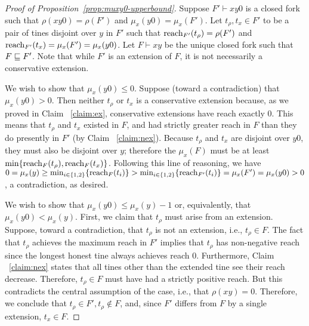\begin{proof}[Proof of Proposition~\ref{prop:muxy0-upperbound}]
  Suppose $F'\vdash xy0$ is a closed fork such that 
  $\rho(xy0)=\rho(F')$ and $\mu_x(y0)=\mu_x(F')$. 
  Let $t_\rho, t_x \in F'$ to be a pair of tines disjoint over $y$ in $F'$ such that $\operatorname{reach}_{F'}(t_\rho)=\rho(F')$ and $\operatorname{reach}_{F'}(t_x)=\mu_x(F')=\mu_x(y0)$. 
  Let $F\vdash xy$ be the unique closed fork such that $F\sqsubseteq F'$.  
  Note that while $F'$ is an extension of $F$, 
  it is not necessarily a conservative extension.

    We wish to show that $\mu_x(y0) \leq 0$.
    Suppose (toward a contradiction) that $\mu_x(y0) > 0$. 
    Then neither $t_\rho$ or $t_x$ is a conservative extension because, as we proved in Claim ~\ref{claim:ex}, conservative extensions have reach exactly 0. This means that $t_\rho$ and $t_x$ existed in $F$, and had strictly greater reach in $F$ than they do presently in $F'$ (by Claim ~\ref{claim:nex}). 
    Because $t_\rho$ and $t_x$ 
    are 
    disjoint over $y0$, they must also be disjoint over $y$; therefore the $\mu_x(F)$ must be at least $\min\{\operatorname{reach}_F(t_\rho),\operatorname{reach}_F(t_x)\}$. 
    Following this line of reasoning, we have 
    $0 
    = \mu_x(y) 
    \geq \min_{i \in \{1,2\}}\{\operatorname{reach}_F(t_i)\}
    > \min_{i \in \{1,2\}}\{\operatorname{reach}_{F'}(t_i)\}
    = \mu_x(F') = \mu_x(y0) > 0
    $, a contradiction, as desired.

    We wish to show that $\mu_x(y0) \leq \mu_x(y) - 1$
    or, equivalently, that $\mu_x(y0) < \mu_x(y)$. 
    First, we claim that $t_\rho$ must arise from an extension. 
    Suppose, toward a contradiction, that $t_\rho$ is not an extension, 
    i.e., $t_\rho \in F$. 
    The fact that $t_\rho$ achieves the maximum reach in $F'$ 
    implies that 
    $t_\rho$ has non-negative reach 
    since the longest honest tine always achieves reach 0. 
    Furthermore, 
    Claim ~\ref{claim:nex} states that 
    all tines other than the extended tine see their reach decrease. 
    Therefore, $t_\rho \in F$ must have had a strictly positive reach. 
    But this contradicts the central assumption of the case, i.e., 
    that $\rho(xy)=0$. 
    Therefore, we conclude that $t_\rho \in F', t_\rho \not \in F$, and, 
    since $F'$ differs from $F$ by a single extension, 
    $t_x \in F$.


\end{proof}
